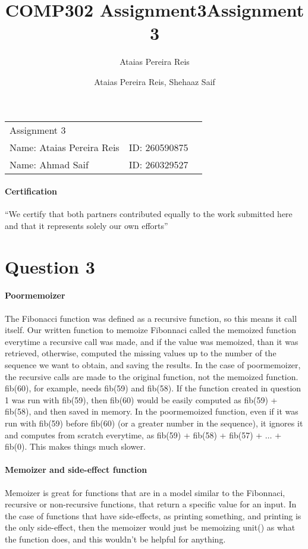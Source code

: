 \documentclass[letterpaper,10pt]{article}
\title{COMP302 Assignment3}
\author{Ataias Pereira Reis}
\title{Assignment 3}
\author{Ataias Pereira Reis, Shehaaz Saif}
\begin{document}
\begin{tabular}{lll}
Assignment 3 & \\
Name: Ataias Pereira Reis & ID: 260590875\\
Name: Ahmad Saif & ID: 260329527\\
\end{tabular}
\paragraph{Certification} ``We certify that both partners contributed equally to the work
submitted here and that it represents solely our own efforts''
\section*{Question 3}
\paragraph{Poormemoizer} The Fibonacci function was defined as a recursive function, so this means it call itself. Our written function to memoize Fibonnaci called the memoized function everytime a recursive call was made, and if the value was memoized, than it was retrieved, otherwise, computed the missing values up to the number of the sequence we want to obtain, and saving the results. In the case of poormemoizer, the recursive calls are made to the original function, not the memoized function. fib(60), for example, needs fib(59) and fib(58). If the function created in question 1 was run with fib(59), then fib(60) would be easily computed as fib(59) + fib(58), and then saved in memory. In the poormemoized function, even if it was run with fib(59) before fib(60) (or a greater number in the sequence), it ignores it and computes from scratch everytime, as fib(59) + fib(58) + fib(57) + $\ldots$ + fib(0). This makes things much slower.
\paragraph{Memoizer and side-effect function} Memoizer is great for functions that are in a model similar to the Fibonnaci, recursive or non-recursive functions, that return a specific value for an input. In the case of functions that have side-effects, as printing something, and printing is the only side-effect, then the memoizer would just be memoizing unit() as what the function does, and this wouldn't be helpful for anything.
\end{document}
